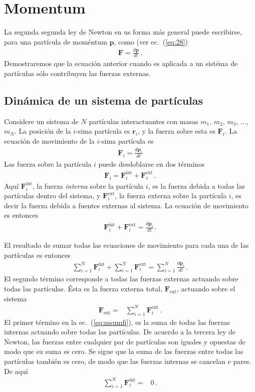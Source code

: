 
\chapter{Momentum}
La segunda  segunda ley de Newton en us forma más general puede escribirse, para una partícula de moméntum $\mathbf{p}$, como (ver ec.~(\ref{eq:28})
\begin{align}
  \mathbf{F}=\frac{d\mathbf{p}}{dt}\,.
\end{align}
Demostraremos que la ecuación anterior cuando es aplicada a un sistéma de partículas sólo contribuyen las fuerzas externas. 

\section{Dinámica de un sistema de partículas}
Considere un sistema de $N$ partículas interactuantes con masas $m_1$, $m_2$, $m_3$, $\ldots$, $m_N$. La posición de la $i$-sima partícula es $\mathbf{r}_i$, y la fuerza sobre esta es $\mathbf{F}_i$. La ecuación de movimiento de la $i$-sima partícula es
\begin{align}
  \mathbf{F}_i=\frac{d\mathbf{p}_i}{dt}
\end{align}
Las fuerza sobre la partícula $i$ puede desdoblarse en dos términos
\begin{align}
  \mathbf{F}_i=\mathbf{F}_i^{\text{int}}+\mathbf{F}_i^{\text{ext}}\,.
\end{align}
Aquí $\mathbf{F}_i^{\text{int}}$, la fuerza \emph{interna} sobre la partícula $i$, es la fuerza debida a todas las partículas dentro del sistema, y $\mathbf{F}_i^{\text{ext}}$, la fuerza externa sobre la partícula $i$, es decir la fuerza debida a fuentes externas al sistema. La ecuación de movimiento es entonces
\begin{align}
  \mathbf{F}_i^{\text{int}}+\mathbf{F}_i^{\text{ext}}=\frac{d\mathbf{p}_i}{dt}\,.
\end{align}

El resultado de sumar todas las ecuaciones de movimiento para cada una de las partículas es entonces
\begin{align}
  \label{eq:msumfi}
  \sum_{i=1}^N  \mathbf{F}_i^{\text{int}}+\sum_{i=1}^N\mathbf{F}_i^{\text{ext}}=\sum_{i=1}^N \frac{d\mathbf{p}_i}{dt}\,.
\end{align}
El segundo término corresponde a todas las fuerzas externas actuando sobre todas las partículas. Ésta es la fuerza externa total, $\mathbf{F}_{\text{ext}}$, actuando sobre el sistema
\begin{align}
 \mathbf{F}_{\text{ext}}=& \sum_{i=1}^N\mathbf{F}_i^{\text{ext}}\,.
\end{align}
El primer término en la ec.~(\ref{eq:msumfi}), es la suma de todas las fuerzas internas actuando sobre todas las partículas. De acuerdo a la tercera ley de Newton, las fuerzas entre cualquier  par de partículas son iguales y opuestas de modo que su suma es cero. Se sigue que la suma de las fuerzas entre todas las partículas también es cero, de modo que las fuerzas internas se cancelan e pares. De aquí
\begin{align}
\sum_{i=1}^N  \mathbf{F}_i^{\text{int}}=&0\,.  
\end{align}

